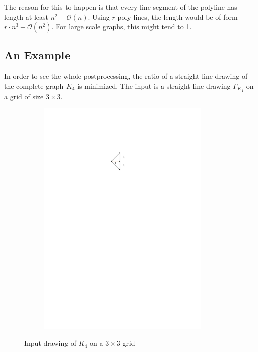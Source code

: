 \bigskip
The reason for this to happen is that every line-segment of the polyline has length at least $n^2 - \mathcal{O}(n)$. Using $r$ poly-lines, the length would be of form $r\cdot n^3 - \mathcal{O}(n^2)$. For large scale graphs, this might tend to 1. 

\subsection{An Example}\label{section:max_planar_example}
In order to see the whole postprocessing, the ratio of a straight-line drawing of the complete graph $K_4$ is minimized. The input is a straight-line drawing $\Gamma_{K_4}$ on a grid of size $3\times3$.
	\begin{figure}[H]
	\centering
	\begin{subfigure}{0.6\linewidth}
		\centering
		\includegraphics[width=0.9\textwidth,page=11]{drawings/maximal_planar.pdf}
	\end{subfigure}
	\caption{Input drawing of $K_4$ on a $3\times3$ grid}
\end{figure}
